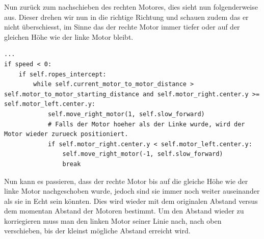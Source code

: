 \documentclass[12pt]{article}
\begin{document}
Nun zurück zum nachschieben des rechten Motores, dies sieht nun folgenderweise aus. Dieser drehen wir nun in die richtige Richtung und schauen zudem das er nicht überschiesst, im Sinne das der rechte Motor immer tiefer oder auf der gleichen Höhe wie der linke Motor bleibt.
\begin{lstlisting}
...
if speed < 0:
	if self.ropes_intercept:
		while self.current_motor_to_motor_distance > self.motor_to_motor_starting_distance and self.motor_right.center.y >= self.motor_left.center.y:
			self.move_right_motor(1, self.slow_forward)
			# Falls der Motor hoeher als der Linke wurde, wird der Motor wieder zurueck positioniert.
			if self.motor_right.center.y < self.motor_left.center.y:
				self.move_right_motor(-1, self.slow_forward)
				break
\end{lstlisting}

Nun kann es passieren, dass der rechte Motor bis auf die gleiche Höhe wie der linke Motor nachgeschoben wurde, jedoch sind sie immer noch weiter auseinander als sie in Echt sein könnten. Dies wird wieder mit dem originalen Abstand versus dem momentan Abstand der Motoren bestimmt. Um den Abstand wieder zu korriegieren muss man den linken Motor seiner Linie nach, nach oben verschieben, bis der kleinst mögliche Abstand erreicht wird.
\end{document}
